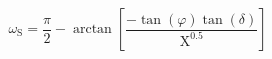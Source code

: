 \documentclass[12pt]{article}
\begin{document}
\begin{displaymath}
\omega_{\mathrm{S}}=\frac{\pi}{2}-\arctan \left[\frac{-\tan (\varphi) \tan (\delta)}{\mathrm{X}^{0.5}}\right]
\end{displaymath}
\end{document}
